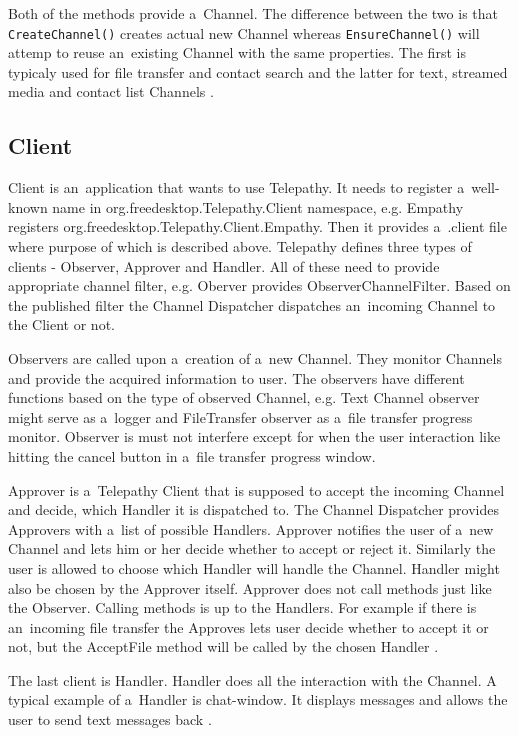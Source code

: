 Both of the methods provide a~Channel. The difference between the two is that \verb|CreateChannel()| creates actual new Channel whereas \verb|EnsureChannel()| will attemp to reuse an~existing Channel with the same properties. The first is typicaly used for file transfer and contact search and the latter for text, streamed media and contact list Channels \cite{TPWiki}.

\subsection*{Client}\label{subsect:tpClient}
Client is an~application that wants to use Telepathy. It needs to register a~well-known name in org.freedesktop.Telepathy.Client namespace, e.g. Empathy registers \newline org.freedesktop.Telepathy.Client.Empathy. Then it provides a~.client file where purpose of which is described above. Telepathy defines three types of clients - Observer, Approver and Handler. All of these need to provide appropriate channel filter, e.g. Oberver provides ObserverChannelFilter. Based on the published filter the Channel Dispatcher dispatches an~incoming Channel to the Client or not.\cite{TPWiki}  

Observers are called upon a~creation of a~new Channel. They monitor Channels and provide the acquired information to user. The observers have different functions based on the type of observed Channel, e.g. Text Channel observer might serve as a~logger and FileTransfer observer as a~file transfer progress monitor. Observer is must not interfere except for when the user interaction like hitting the cancel button in a~file transfer progress window.\cite{TPWiki}     

Approver is a~Telepathy Client that is supposed to accept the incoming Channel and decide, which Handler it is dispatched to. The Channel Dispatcher provides Approvers with a~list of possible Handlers. Approver notifies the user of a~new Channel and lets him or her decide whether to accept or reject it. Similarly the user is allowed to choose which Handler will handle the Channel. Handler might also be chosen by the Approver itself. Approver does not call methods just like the Observer. Calling methods is up to the Handlers. For example if there is an~incoming file transfer the Approves lets user decide whether to accept it or not, but the AcceptFile method will be called by the chosen Handler \cite{TPWiki}.  

The last client is Handler. Handler does all the interaction with the Channel. A typical example of a~Handler is chat-window. It displays messages and allows the user to send text messages back \cite{TPWiki}.  

